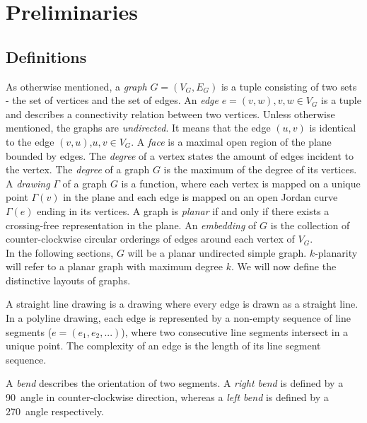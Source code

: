 \section{Preliminaries}
\subsection{Definitions}
As otherwise mentioned, a \textit{graph} $G=(V_G,E_G)$ is a tuple consisting of two sets - the set of vertices and the set of edges. An \textit{edge} $e = (v,w), v,w \in V_G$ is a tuple and describes a connectivity relation between two vertices. Unless otherwise mentioned, the graphs are \textit{undirected}. It means that the edge $(u,v)$ is identical to the edge $(v,u)$,$u,v\in V_G$. A \textit{face} is a maximal open region of the plane bounded by edges. The \textit{degree} of a vertex states the amount of edges incident to the vertex. The \textit{degree} of a graph $G$ is the maximum of the degree of its vertices. A \textit{drawing} $\Gamma$ of a graph $G$ is a function, where each vertex is mapped on a unique point $\Gamma(v)$ in the plane and each edge is mapped on an open Jordan curve $\Gamma(e)$ ending in its vertices. A graph is \textit{planar} if and only if there exists a crossing-free representation in the plane. An \textit{embedding} of $G$ is the collection of counter-clockwise circular orderings of edges around each vertex of $V_G$. \cite[p.225]{Ortho}
\\
In the following sections, $G$ will be a planar undirected simple graph. $k$-planarity will refer to a planar graph with maximum degree $k$. We will now define the distinctive layouts of graphs.
\begin{definition}
	A straight line drawing is a drawing where every edge is drawn as a straight line. In a polyline drawing, each edge is represented by a non-empty sequence of line segments ($e = (e_1,e_2,...)$), where two consecutive line segments intersect in a unique point. The complexity of an edge is the length of its line segment sequence.
\end{definition}
\begin{definition}[Bends]
	A \textit{bend} describes the orientation of two segments. A \textit{right bend} is defined by a 90\degree~angle in counter-clockwise direction, whereas a \textit{left bend} is defined by a 270\degree~angle respectively.
\end{definition}
